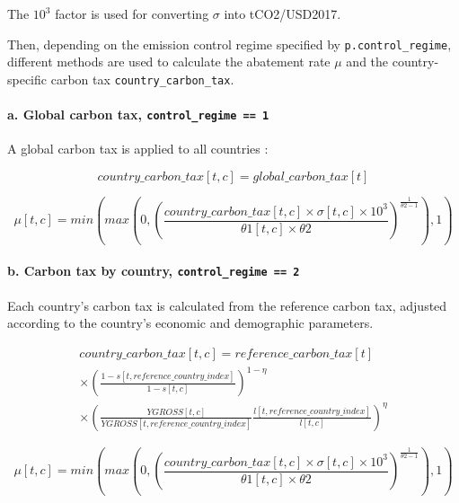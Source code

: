 \documentclass[
]{article}
\begin{document}
The \(10^3\) factor is used for converting \(\sigma\) into tCO2/USD2017.

Then, depending on the emission control regime specified by
\texttt{p.control\_regime}, different methods are used to calculate the
abatement rate \(\mu\) and the country-specific carbon tax
\texttt{country\_carbon\_tax}.

\paragraph{\texorpdfstring{a. Global carbon tax,
\texttt{control\_regime\ ==\ 1}}{a. Global carbon tax, control\_regime == 1}}\label{a.-global-carbon-tax-control_regime-1}

A global carbon tax is applied to all countries :

\begin{equation}
country\_carbon\_tax[t,c] = global\_carbon\_tax[t]
\end{equation}


\begin{equation}
 \mu[t,c] = min \left(max(0, (\frac{country\_carbon\_tax[t,c] \times \sigma[t,c] \times 10^3}{\theta1[t,c] \times \theta2})^{\frac{1}{\theta2 - 1}}), 1 \right) 
\end{equation}


\paragraph{\texorpdfstring{b. Carbon tax by country,
\texttt{control\_regime\ ==\ 2}}{b. Carbon tax by country, control\_regime == 2}}\label{b.-carbon-tax-by-country-control_regime-2}

Each country's carbon tax is calculated from the reference carbon tax,
adjusted according to the country's economic and demographic parameters.

\begin{multline}
country\_carbon\_tax[t,c] = reference\_carbon\_tax[t]\\ \times \left(\frac{1 - s[t,reference\_country\_index]}{1 - s[t,c]} \right)^{1-\eta}\\
\times \left(\frac{YGROSS[t,c]  }{YGROSS[t,reference\_country\_index] } \frac{l[t,reference\_country\_index]}{l[t,c]} \right)^\eta
\end{multline}


\begin{equation}
 \mu[t,c] = min \left(max(0, (\frac{country\_carbon\_tax[t,c] \times \sigma[t,c] \times 10^3}{\theta1[t,c] \times \theta2})^{\frac{1}{\theta2 - 1}}), 1 \right) 
\end{equation}
\end{document}
